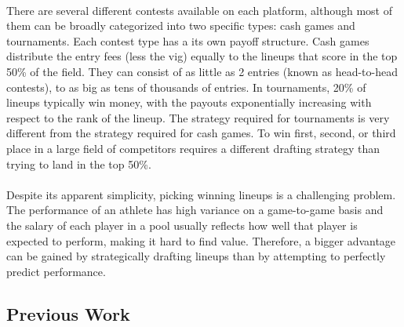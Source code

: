 \documentclass{article}
\begin{document}
\\
There are several different contests available on each platform, although most of them can be broadly categorized into two specific types: cash games and tournaments. Each contest type has a its own payoff structure. Cash games distribute the entry fees (less the vig) equally to the lineups that score in the top 50\% of the field. They can consist of as little as 2 entries (known as head-to-head contests), to as big as tens of thousands of entries. In tournaments, 20\% of lineups typically win money, with the payouts exponentially increasing with respect to the rank of the lineup. The strategy required for tournaments is very different from the strategy required for cash games. To win first, second, or third place in a large field of competitors requires a different drafting strategy than trying to land in the top 50\%.\\
\\
Despite its apparent simplicity, picking winning lineups is a challenging problem. The performance of an athlete has high variance on a game-to-game basis and the salary of each player in a pool usually reflects how well that player is expected to perform, making it hard to find value. Therefore, a bigger advantage can be gained by strategically drafting lineups than by attempting to perfectly predict performance.

\subsection{Previous Work}
\end{document}
